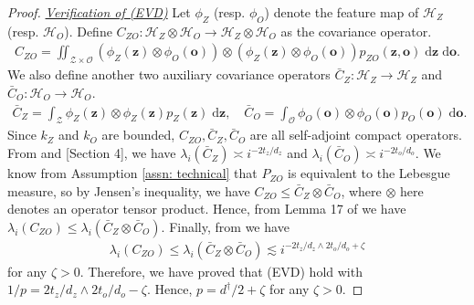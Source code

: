 \documentclass[11pt]{article}
\newcommand{\deffective}{d^{\dag}}
\newcommand{\bz}{\mathbf z}
\newcommand{\bo}{\mathbf o}
\newcommand{\calZ}{\mathcal{Z}}
\newcommand{\calH}{\mathcal{H}}
\newcommand{\calO}{\mathcal{O}}
\newcommand{\0}{\mathbf{0}}
\begin{document}
\begin{appendix}
\begin{proof}
\vspace{3mm}
\noindent
\underline{\textit{Verification of (EVD)}}
Let $\phi_{Z}$ (resp. $\phi_{O}$) denote the feature map of $\calH_{Z}$ (resp. $\calH_{O}$). Define $C_{ZO}:\calH_Z \otimes \calH_O \to \calH_Z \otimes \calH_O$ as the covariance operator.
\begin{align*}
    C_{ZO} = \iint_{\calZ\times\calO} (\phi_Z(\bz) \otimes \phi_O(\bo)) \otimes (\phi_Z(\bz) \otimes \phi_O(\bo)) p_{ZO}(\bz, \bo) \;\mathrm{d}\bz \;\mathrm{d}\bo .
\end{align*}
We also define another two auxiliary covariance operators $\bar{C}_Z:\calH_Z\to \calH_Z$ and $\bar{C}_O:\calH_O\to \calH_O$.
\begin{align*}
    \bar{C}_Z = \int_\calZ \phi_Z(\bz) \otimes \phi_Z(\bz) p_
    {Z}(\bz)\;\mathrm{d}\bz, \quad \bar{C}_O = \int_\calO \phi_O(\bo) \otimes \phi_O(\bo)p_O(\bo)\; \mathrm{d}\bo .
\end{align*}
Since $k_Z$ and $k_O$ are bounded, $C_{ZO}, \bar{C}_Z, \bar{C}_O$ are all self-adjoint compact operators. 
From \cite{edmunds1996function} and \cite{fischer2020sobolev}[Section 4], we have $\lambda_i(\bar{C}_Z) \asymp i^{-2 t_z/d_z}$ and $\lambda_i(\bar{C}_O) \asymp i^{-2 t_o/d_o}$. 
We know from Assumption \ref{assn: technical} that $P_{ZO}$ is equivalent to the Lebesgue measure, so by Jensen's inequality, we have $C_{ZO} \leq \bar{C}_Z \otimes \bar{C}_O$, where $\otimes$ here denotes an operator tensor product. Hence, from Lemma 17 of \cite{meunier2024nonparametricinstrumentalregressionkernel} we have $\lambda_i(C_{ZO}) \leq \lambda_i(\bar{C}_Z \otimes \bar{C}_O)$. Finally, from  we have 
\begin{align*}
    \lambda_i(C_{ZO}) \leq \lambda_i(\bar{C}_Z \otimes \bar{C}_O) \lesssim i^{-2 t_z/d_z \wedge 2 t_o/d_o + \zeta}
\end{align*}
for any $\zeta > 0$.
Therefore, we have proved that (EVD) hold with $1/p = 2 t_z/d_z \wedge 2 t_o/d_o - \zeta$.
Hence, $p = \deffective/2 + \zeta$ for any $\zeta > 0$.


\end{proof}
\end{appendix}
\end{document}
